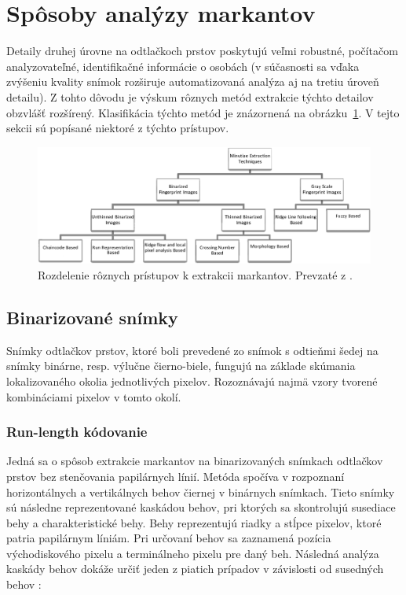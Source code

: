   \section{Spôsoby analýzy markantov} \label{sec:analyza_markantov}
  Detaily druhej úrovne na odtlačkoch prstov poskytujú veľmi robustné, počítačom analyzovateľné, identifikačné informácie o osobách (v súčasnosti sa vďaka
  zvýšeniu kvality snímok rozširuje automatizovaná analýza aj na tretiu úroveň detailu). Z tohto dôvodu je výskum rôznych metód extrakcie týchto detailov
  obzvlášť rozšírený. Klasifikácia týchto metód je znázornená na obrázku~{\ref{obr:diagram_extrakcia_markantov}}. V tejto sekcii sú popísané niektoré
  z týchto prístupov.

  \begin{figure}[h]
    \centering
    \includegraphics[width=\linewidth]{obrazky-figures/klasifikacia_extrakcie_markantov.png}
    \caption{Rozdelenie rôznych prístupov k extrakcii markantov. Prevzaté z \cite{bansal2011minutiae}.}
    \label{obr:diagram_extrakcia_markantov}
  \end{figure}

  \subsection{Binarizované snímky}
  Snímky odtlačkov prstov, ktoré boli prevedené zo snímok s odtieňmi šedej na snímky binárne, resp. výlučne čierno-biele, fungujú na základe skúmania
  lokalizovaného okolia jednotlivých pixelov. Rozoznávajú najmä vzory tvorené kombináciami pixelov v tomto okolí.

  \subsubsection{Run-length kódovanie}
  Jedná sa o spôsob extrakcie markantov na binarizovaných snímkach odtlačkov prstov bez stenčovania papilárnych línií.
  Metóda spočíva v rozpoznaní horizontálnych a vertikálnych behov čiernej v binárnych snímkach. Tieto snímky sú následne reprezentované kaskádou behov,
  pri ktorých sa skontrolujú susediace behy a charakteristické behy. Behy reprezentujú riadky a stĺpce pixelov, ktoré patria papilárnym líniám. Pri určovaní
  behov sa zaznamená pozícia východiskového pixelu a terminálneho pixelu pre daný beh. Následná analýza kaskády behov dokáže určiť jeden z piatich
  prípadov v závislosti od susedných behov \cite{bansal2011minutiae}:

